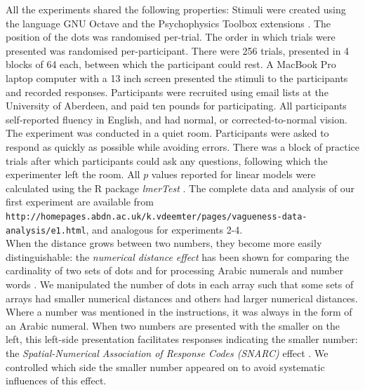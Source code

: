 \documentclass[%
man,		%
floatsintext,%
apacite%
]{apa6} %
\begin{document}
All the experiments shared the following properties: 
Stimuli were created using the language GNU Octave \cite{eaton:2002} and the Psychophysics Toolbox extensions \cite{ptbx1, ptbx2}.
The position of the dots was randomised per-trial.
The order in which trials were presented was randomised per-participant. 
There were 256 trials, presented in 4 blocks of 64 each, between which the participant could rest. 
A MacBook Pro laptop computer with a 13 inch screen presented the stimuli to the participants and recorded responses. 
Participants were recruited using email lists at the University of Aberdeen, and paid ten pounds for participating.
All participants self-reported fluency in English, and had normal, or corrected-to-normal vision.
The experiment was conducted in a quiet room. 
Participants were asked to respond as quickly as possible while avoiding errors.
There was a block of practice trials after which participants could ask any questions, following which the experimenter left the room.
All $p$ values reported for linear models were calculated using the R package \emph{lmerTest} \cite{lmerTest}. The complete data and analysis of our first experiment are available from 
{\tt http://homepages.abdn.ac.uk/k.vdeemter/pages/vagueness-data-analysis/e1.html}, and analogous for experiments 2-4.\\[2ex]

\noindent When the distance grows between two numbers, they become more easily distinguishable: the \emph{numerical distance effect} has been shown for comparing the cardinality of two sets of dots \cite{van123} and for processing Arabic numerals and number words \cite{Dehaene1996}. We manipulated the number of dots in each array such that some sets of arrays had smaller numerical distances and others had larger numerical distances. Where a number was mentioned in the instructions, it was always in the form of an Arabic numeral. When two numbers are presented with the smaller on the left, this left-side presentation facilitates responses indicating the smaller number: the \emph{Spatial-Numerical Association of Response Codes (SNARC)} effect \cite{dehaene1993mental, gevers2006automatic}. We controlled which side the smaller number appeared on to avoid systematic influences of this effect. 
\end{document}
